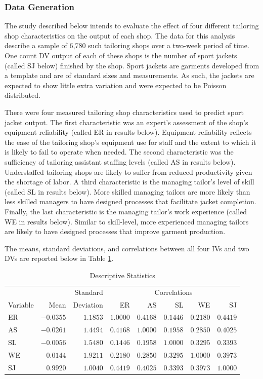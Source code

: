 \documentclass[ShortAfour,times,sageapa]{sagej}
\begin{document}
		\subsubsection{Data Generation}
	
	The study described below intends to evaluate the effect of four different tailoring shop characteristics on the output of each shop.
	The data for this analysis describe a sample of 6,780 such tailoring shops over a two-week period of time.
	One count DV output of each of these shops is the number of sport jackets (called SJ below) finished by the shop.
	Sport jackets are garments developed from a template and are of standard sizes and measurements.
	As such, the jackets are expected to show little extra variation and were expected to be Poisson distributed.
	
	There were four measured tailoring shop characteristics used to predict sport jacket output. 
	The first characteristic was an expert's assessment of the shop's equipment reliability (called ER in results below).
	Equipment reliability reflects the ease of the tailoring shop's equipment use for staff and the extent to which it is likely to fail to operate when needed. 
	The second characteristic was the sufficiency of tailoring assistant staffing levels (called AS in results below).
	Understaffed tailoring shops are likely to suffer from reduced productivity given the shortage of labor.
	A third characteristic is the managing tailor's level of skill (called SL in results below).
	More skilled managing tailors are more likely than less skilled managers to have designed processes that facilitate jacket completion.
	Finally, the last characteristic is the managing tailor's work experience (called WE in results below).
	Similar to skill-level, more experienced managing tailors are likely to have designed processes that improve garment production.
	
	The means, standard deviations, and correlations between all four IVs and two DVs are reported below in Table \ref{tab:desc}. 
	
	\begin{table}[h!]
		\centering
		\caption{\centering Descriptive Statistics} 
		\begin{tabular}{lrr|rrrrr}
			\toprule
			&  & Standard & \multicolumn{5}{c}{Correlations} \\ 
			\cmidrule(lr){4-8}
			Variable & Mean & Deviation & ER & AS & SL & WE & SJ \\ 
			\midrule
			ER & $-0.0355$ & $1.1853$ & $1.0000$ & $0.4168$ & $0.1446$ & $0.2180$ & $0.4419$ \\ 
			AS & $-0.0261$ & $1.4494$ & $0.4168$ & $1.0000$ & $0.1958$ & $0.2850$ & $0.4025$ \\ 
			SL & $-0.0056$ & $1.5480$ & $0.1446$ & $0.1958$ & $1.0000$ & $0.3295$ & $0.3393$ \\ 
			WE & $0.0144$ & $1.9211$ & $0.2180$ & $0.2850$ & $0.3295$ & $1.0000$ & $0.3973$ \\ 
			SJ & $0.9920$ & $1.0040$ & $0.4419$ & $0.4025$ & $0.3393$ & $0.3973$ & $1.0000$ \\ 
			\bottomrule
		\end{tabular}
		\label{tab:desc}
	\end{table}
\end{document}
